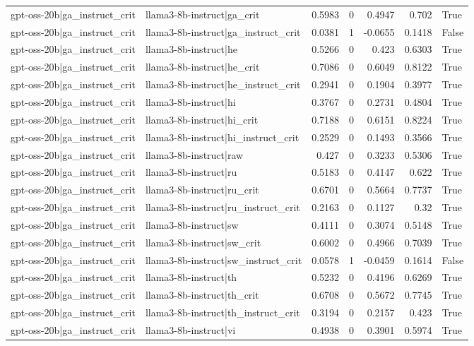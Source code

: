 \begin{table}
\begin{tabular}{l l r r r r l}
gpt-oss-20b|ga_instruct_crit & llama3-8b-instruct|ga_crit & 0.5983 & 0 & 0.4947 & 0.702 & True \\
gpt-oss-20b|ga_instruct_crit & llama3-8b-instruct|ga_instruct_crit & 0.0381 & 1 & -0.0655 & 0.1418 & False \\
gpt-oss-20b|ga_instruct_crit & llama3-8b-instruct|he & 0.5266 & 0 & 0.423 & 0.6303 & True \\
gpt-oss-20b|ga_instruct_crit & llama3-8b-instruct|he_crit & 0.7086 & 0 & 0.6049 & 0.8122 & True \\
gpt-oss-20b|ga_instruct_crit & llama3-8b-instruct|he_instruct_crit & 0.2941 & 0 & 0.1904 & 0.3977 & True \\
gpt-oss-20b|ga_instruct_crit & llama3-8b-instruct|hi & 0.3767 & 0 & 0.2731 & 0.4804 & True \\
gpt-oss-20b|ga_instruct_crit & llama3-8b-instruct|hi_crit & 0.7188 & 0 & 0.6151 & 0.8224 & True \\
gpt-oss-20b|ga_instruct_crit & llama3-8b-instruct|hi_instruct_crit & 0.2529 & 0 & 0.1493 & 0.3566 & True \\
gpt-oss-20b|ga_instruct_crit & llama3-8b-instruct|raw & 0.427 & 0 & 0.3233 & 0.5306 & True \\
gpt-oss-20b|ga_instruct_crit & llama3-8b-instruct|ru & 0.5183 & 0 & 0.4147 & 0.622 & True \\
gpt-oss-20b|ga_instruct_crit & llama3-8b-instruct|ru_crit & 0.6701 & 0 & 0.5664 & 0.7737 & True \\
gpt-oss-20b|ga_instruct_crit & llama3-8b-instruct|ru_instruct_crit & 0.2163 & 0 & 0.1127 & 0.32 & True \\
gpt-oss-20b|ga_instruct_crit & llama3-8b-instruct|sw & 0.4111 & 0 & 0.3074 & 0.5148 & True \\
gpt-oss-20b|ga_instruct_crit & llama3-8b-instruct|sw_crit & 0.6002 & 0 & 0.4966 & 0.7039 & True \\
gpt-oss-20b|ga_instruct_crit & llama3-8b-instruct|sw_instruct_crit & 0.0578 & 1 & -0.0459 & 0.1614 & False \\
gpt-oss-20b|ga_instruct_crit & llama3-8b-instruct|th & 0.5232 & 0 & 0.4196 & 0.6269 & True \\
gpt-oss-20b|ga_instruct_crit & llama3-8b-instruct|th_crit & 0.6708 & 0 & 0.5672 & 0.7745 & True \\
gpt-oss-20b|ga_instruct_crit & llama3-8b-instruct|th_instruct_crit & 0.3194 & 0 & 0.2157 & 0.423 & True \\
gpt-oss-20b|ga_instruct_crit & llama3-8b-instruct|vi & 0.4938 & 0 & 0.3901 & 0.5974 & True \\

\end{tabular}
\end{table}
